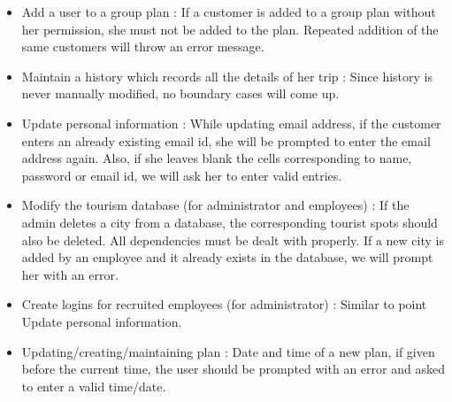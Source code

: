 \documentclass[11pt]{article}
\begin{document}
\begin{itemize}
\item Add a user to a group plan :
\newline
If a customer is added to a group plan without her permission, she must not be added to the plan. Repeated addition of the same customers will throw an error message.

\item Maintain a history which records all the details of her trip :
\newline
Since history is never manually modified, no boundary cases will come up.

\item Update personal information :
\newline
While updating email address, if the customer enters an already existing email id, she will be prompted to enter the email address again. Also, if she leaves blank the cells corresponding to name, password or email id, we will ask her to enter valid entries.

\item Modify the tourism database (for administrator and employees) :
\newline
If the admin deletes a city from a database, the corresponding tourist spots should also be deleted. All dependencies must be dealt with properly.
\newline
If a new city is added by an employee and it already exists in the database, we will prompt her with an error.

\item Create logins for recruited employees (for administrator) :
\newline
Similar to point Update personal information.

\item Updating/creating/maintaining plan :
\newline
Date and time of a new plan, if given before the current time, the user should be prompted with an error and asked to enter a valid time/date.

\end{itemize}
\end{document}
